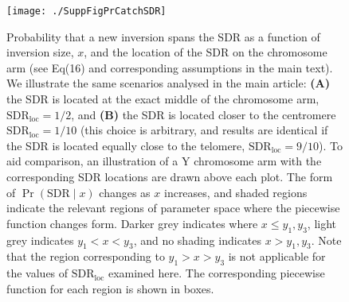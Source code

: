 \documentclass{article}
\begin{document}
\newpage


\begin{figure}[htbp]
 \centering
 \texttt{[image: ./SuppFigPrCatchSDR]}
 \caption{Probability that a new inversion spans the SDR as a function of inversion size, $x$, and the location of the SDR on the chromosome arm (see Eq(16) and corresponding assumptions in the main text). We illustrate the same scenarios analysed in the main article: \textbf{(A)} the SDR is located at the exact middle of the chromosome arm, $\text{SDR}_\text{loc} = 1/2$, and \textbf{(B)} the SDR is located closer to the centromere $\text{SDR}_\text{loc} = 1/10$ (this choice is arbitrary, and results are identical if the SDR is located equally close to the telomere, $\text{SDR}_\text{loc} = 9/10$). To aid comparison, an illustration of a Y chromosome arm with the corresponding SDR locations are drawn above each plot. The form of $\Pr (\text{SDR} \mid x)$ changes as $x$ increases, and shaded regions indicate the relevant regions of parameter space where the piecewise function changes form. Darker grey indicates where $x \leq y_1,y_3$, light grey indicates $y_1 < x < y_3$, and no shading indicates $x > y_1, y_3$. Note that the region corresponding to $y_1 > x > y_3$ is not applicable for the values of $\text{SDR}_\text{loc}$ examined here. The corresponding piecewise function for each region is shown in boxes.}
 \label{fig:PrCatchFixFig}
 \end{figure}




\newpage
\end{document}
